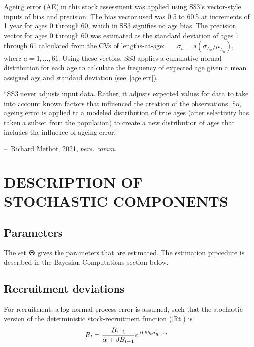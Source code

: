\documentclass[11pt]{book}
\makeatletter
\newcommand{\Norm}{\mathcal{N}}%
\def\bfTh{{\bf \Theta}}%
\def\minus{%
  \setbox0=\hbox{-}%
  \vcenter{%
    \hrule width\wd0 height 0.05pt%
  }%
}
\newenvironment{chapquote}[2][2em]
  {\setlength{\@tempdima}{#1}%
   \def\chapquote@author{#2}%
   \parshape 1 \@tempdima \dimexpr\textwidth-2\@tempdima\relax%
   \small\color{colquote}}
  {\par\normalfont\hfill--\ \chapquote@author\hspace*{\@tempdima}\par\smallskip}
\def\bfTh{{\bf \Theta}}%
\def\vsd{\vspace*{1ex}}%
\renewcommand{\eb}{\vsd \vsd \begin{eqnarray}}
\renewcommand{\ee}{\end{eqnarray} \vsd }
\makeatother
\begin{document}
Ageing error (AE) in this stock assessment was applied using SS3's vector-style inputs of bias and precision.
The bias vector used was 0.5 to 60.5 at increments of 1 year for ages 0 through 60, which in SS3 signifies no age bias.
The precision vector for ages 0 through 60 was estimated as the standard deviation of ages 1 through 61 calculated from the CVs of lengths-at-age:
~~~$\sigma_a = a (\sigma_{L_a} / \mu_{L_a})$, where $a=1,...,61$.
Using these vectors, SS3 applies a cumulative normal distribution for each age to calculate the frequency of expected age given a mean assigned age and standard deviation (see~\ref{age.err}).

\begin{chapquote}{Richard Methot, 2021, \textit{pers. comm.}}
``SS3 never adjusts input data.  Rather, it adjusts expected values for data to take into account known factors that influenced the creation of the observations. So, ageing error is applied to a modeled distribution of true ages (after selectivity has taken a subset from the population) to create a new distribution of ages that includes the influence of ageing error.''
\end{chapquote}

\section{DESCRIPTION OF STOCHASTIC COMPONENTS}

\subsection{Parameters}

The set $\bfTh$ gives the parameters that are estimated. 
The estimation procedure is described in the Bayesian Computations section below.

\subsection{Recruitment deviations}

For recruitment, a log-normal process error is assumed, such that the stochastic version of the deterministic stock-recruitment function (\ref{Rt}) is
\eb
R_t = \frac{B_{t-1}}{\alpha + \beta B_{t-1}} e^{\minus 0.5 b_t \sigma_R^2 + \epsilon_t} \label{Rt.sto}
\ee \\[-0.25ex]

\end{document}
